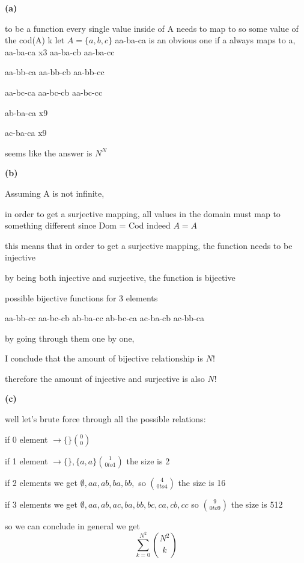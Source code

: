 \documentclass[12pts,A4]{article}
\begin{document}
\begin{flushleft}
    \textbf{(a)}


    to be a function every single value inside of A needs to map to so
    some value of the cod(A)
k
    let $A = \{ a,b,c \}$
    aa-ba-ca is an obvious one
    if a always maps to a,
    aa-ba-ca x3
    aa-ba-cb
    aa-ba-cc

    aa-bb-ca
    aa-bb-cb
    aa-bb-cc
    
    aa-bc-ca
    aa-bc-cb
    aa-bc-cc
    

    ab-ba-ca
    x9

    ac-ba-ca
    x9
    
    seems like the answer is $N^{N}$
    \bigskip

    \textbf{(b)}

    Assuming A is not infinite,


    in order to get a surjective mapping, all values in the domain
    must map to something different since Dom = Cod indeed $A = A$

    this means that in order to get a surjective mapping, the function
    needs to be injective
    
    by being both injective and surjective, the function is bijective
    
    possible bijective functions for 3 elements

    aa-bb-cc aa-bc-cb ab-ba-cc ab-bc-ca ac-ba-cb ac-bb-ca 

    by going through them one by one, 
    
    I conclude that the amount of bijective relationship is $N!$

    therefore the amount of injective and surjective is also $N!$

    \bigskip
    
    \textbf{(c)}
    
    well let's brute force through all the possible relations:

    if 0 element $\rightarrow \{\} \binom{0}{0}$

    if 1 element $\rightarrow \{\} , \{a,a\} \binom{1} {0 to 1} $ the size is 2

    if 2 elements we get $ \emptyset , aa , ab, ba, bb, $ so $ \binom{4} {0 to 4} $ the size is 16

    if 3 elements we get $ \emptyset, aa , ab, ac, ba, bb, bc, ca, cb, cc $ so $ \binom{9} {0 to 9}$ the size is 512

    so we can conclude in general we get 
    $$\sum_{k=0}^{N^{2}} \binom{N^{2}} {k} $$ 


\end{flushleft}
\end{document}
